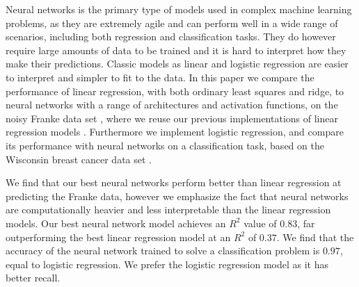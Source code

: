 Neural networks is the primary type of models used in complex machine learning problems, as they are extremely agile and can perform well in a wide range of scenarios, including both regression and classification tasks.
They do however require large amounts of data to be trained and it is hard to interpret how they make their predictions.
Classic models as linear and logistic regression are easier to interpret and simpler to fit to the data.
In this paper we compare the performance of linear regression, with both ordinary least squares and ridge, to neural networks with a range of architectures and activation functions, on the noisy Franke data set \cite{frank}, where we reuse our previous implementations of linear regression models \cite{project1}.
Furthermore we implement logistic regression, and compare its performance with neural networks on a classification task, based on the Wisconsin breast cancer data set \cite{breast_cancer_wisconsin}.

We find that our best neural networks perform better than linear regression at predicting the Franke data, however we emphasize the fact that neural networks are computationally heavier and less interpretable than the linear regression models.
Our best neural network model achieves an $R^2$ value of $0.83$, far outperforming the best linear regression model at an $R^2$ of $0.37$.
We find that the accuracy of the neural network trained to solve a classification problem is $0.97$, equal to logistic regression. We prefer the logistic regression model as it has better recall.


